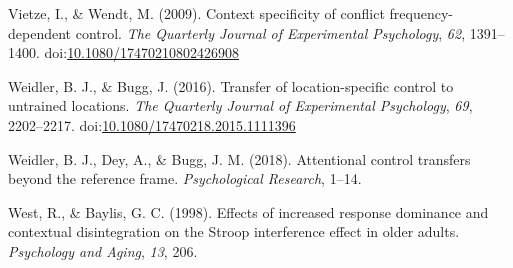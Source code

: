 \documentclass[english,,man,floatsintext]{apa6}
\begin{document}
\hypertarget{ref-vietze_context_2009}{}
Vietze, I., \& Wendt, M. (2009). Context specificity of conflict
frequency-dependent control. \emph{The Quarterly Journal of Experimental
Psychology}, \emph{62}, 1391--1400.
doi:\href{https://doi.org/10.1080/17470210802426908}{10.1080/17470210802426908}

\hypertarget{ref-weidler_transfer_2016}{}
Weidler, B. J., \& Bugg, J. (2016). Transfer of location-specific
control to untrained locations. \emph{The Quarterly Journal of
Experimental Psychology}, \emph{69}, 2202--2217.
doi:\href{https://doi.org/10.1080/17470218.2015.1111396}{10.1080/17470218.2015.1111396}

\hypertarget{ref-weidler_attentional_2018}{}
Weidler, B. J., Dey, A., \& Bugg, J. M. (2018). Attentional control
transfers beyond the reference frame. \emph{Psychological Research},
1--14.

\hypertarget{ref-west_effects_1998}{}
West, R., \& Baylis, G. C. (1998). Effects of increased response
dominance and contextual disintegration on the Stroop interference
effect in older adults. \emph{Psychology and Aging}, \emph{13}, 206.

\endgroup
\end{document}
